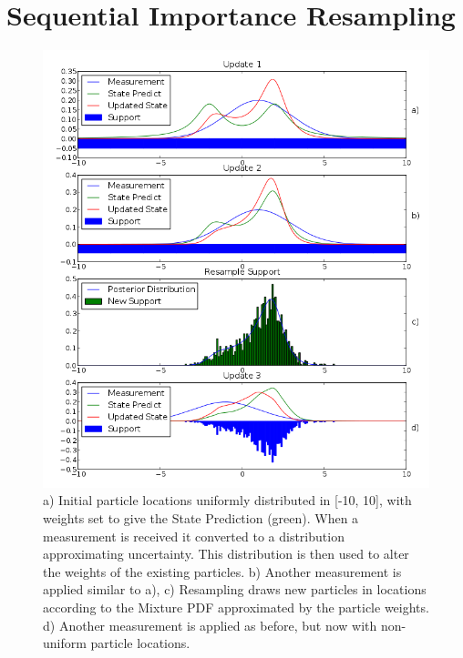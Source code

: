 \section{Sequential Importance Resampling}
\label{sec:Particle Filter Resampling}
\begin{figure}
\includegraphics[width=16cm]{images/particle_filter2}
\caption[Example Particle Filter Progression]{a) Initial particle locations
uniformly distributed in [-10, 10], with
weights set to give the State Prediction (green). When a measurement is
received it converted to a distribution approximating uncertainty. This
distribution is then used to alter the weights of the existing particles.
b) Another measurement is applied similar to a), c) Resampling draws
new particles in locations according to the Mixture \ac{PDF} approximated 
by the particle weights. d) Another measurement is applied as before,
but now with non-uniform particle locations.}
\end{figure}

